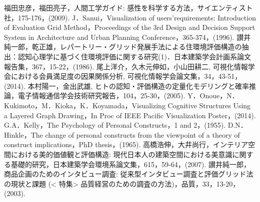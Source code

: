 \documentclass[syuuron]{kuee}
\begin{document}


\begin{thebibliography}{数字}
	 福田忠彦，福田亮子，人間工学ガイド: 感性を科学する方法，サイエンティスト社，175-176，(2009).
	 J．Sanui，Visualization of users’requirements: Introduction of Evaluation Grid Method，Proceedings of the 3rd Design and Decision Support System in Architecture and Urban Planning Conference，365-374，(1996).
	 讃井純一郎，乾正雄，レパートリー・グリッド発展手法による住環境評価構造の抽出：認知心理学に基づく住環境評価に関する研究(1)．日本建築学会計画系論文報告集，367，15-22，(1986).
	 尾上洋介，久木元伸如，小山田耕二, 可視化情報学会における会員満足度の因果関係分析, 可視化情報学会論文集，34，43-51，(2014).
	 本村陽一，金出武雄, ヒトの認知・評価構造の定量化モデリングと確率推論，電子情報通信学会技術研究報告，104，25-30，(2005).
	 Y．Onoue，N．Kukimoto，M．Kioka，K．Koyamada，Visualizing Cognitive Structures Using a Layered Graph Drawing，In Proc of IEEE Pacific Visualization Poster，(2014).
	 G.A．Kelly，The Psychology of Personal Constructs，1 and 2，(1955).
	 D.N．Hinkle，The change of personal constructs from the viewpoint of a theory of construct implications，PhD thesis，(1965).
	 高橋浩伸，大井尚行，インテリア空間における美的価値観と評価構造: 現代日本人の建築空間における美意識に関する基礎的研究，日本建築学会環境系論文集，615，59-64，(2007).
	 讃井純一郎，商品企画のためのインタビュー調査: 従来型インタビュー調査と評価グリッド法の現状と課題 (< 特集> 品質経営のための調査の方法)，品質，33，13-20，(2003).


\end{thebibliography}
\end{document}
